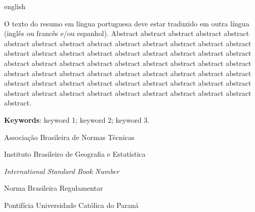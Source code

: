 \begin{resumo}
\SingleSpacing
    \begin{otherlanguage*}{english}
    
        \noindent O texto do resumo em língua portuguesa deve estar traduzido em outra língua (inglês ou francês e/ou espanhol). Abstract abstract abstract abstract abstract abstract abstract abstract abstract abstract abstract abstract abstract abstract abstract abstract abstract abstract abstract abstract abstract abstract abstract abstract abstract abstract abstract abstract abstract abstract abstract abstract abstract abstract abstract abstract abstract abstract abstract abstract abstract abstract abstract abstract abstract abstract abstract abstract abstract abstract abstract abstract abstract abstract abstract abstract abstract abstract abstract abstract.
        
        \vspace{\onelineskip}
        
        \noindent 
        \textbf{Keywords}: keyword 1; keyword 2; keyword 3.
        
    \end{otherlanguage*}
\end{resumo}






\listoffigures*
\cleardoublepage


\listofquadros*
\cleardoublepage




\listoftables*
\cleardoublepage

\listofplots*
\cleardoublepage


\begin{siglas}
    \item[ABNT] Associação Brasileira de Normas Técnicas
    \item[IBGE] Instituto Brasileiro de Geografia e Estatística
    \item[ISBN] \textit{International Standard Book Number}
    \item[NBR] Norma Brasileira Regulamentar
    \item[PUCPR] Pontifícia Universidade Católica do Paraná
\end{siglas}



